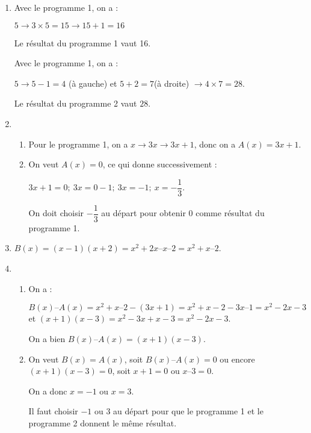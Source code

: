 
\medskip

\begin{enumerate}
\item Avec le programme 1, on a :

$5 \to  3 \times 5 = 15 \to 15 + 1 = 16$

Le résultat du programme 1 vaut 16.
 
Avec le programme 1, on a :

$5 \to 5 - 1 = 4$ (à gauche) et  $5 + 2 = 7 $(à droite) $\to  4 \times 7 = 28$.

Le résultat du programme 2 vaut $28$.
\item 
	\begin{enumerate}
		\item Pour le programme 1, on a $x \to  3x \to  3x + 1$, donc on a
$A(x) = 3x + 1$.
		\item  On veut $A(x) = 0$, ce qui donne successivement :
		
$3x + 1 = 0 ;\: 3x = 0 - 1 ; \:3x = -1  ;\: x = - \dfrac{1}{3}$.

On doit choisir $- \dfrac{1}{3}$ au départ pour obtenir $0$ comme résultat du programme 1.
	\end{enumerate} 
\item  $B(x) = (x - 1)(x + 2) = x^2 + 2x – x – 2 = x^2 + x – 2$.
\item 
	\begin{enumerate}
		\item On a : 
		
$B(x) – A(x) = x^2 + x – 2 - (3x + 1) = x^2 + x - 2 - 3x – 1 = x^2 - 2x - 3$
et $(x + 1)(x - 3) = x^2 - 3x + x - 3 = x^2 - 2x - 3$.

On a bien $B(x) – A(x) = (x + 1)(x - 3)$.
		\item  On veut $B(x) = A(x)$, soit $B(x) – A(x) = 0$ ou encore
$(x + 1)(x - 3) = 0$, soit $x + 1 = 0$ ou $x – 3 = 0$.

On a donc $x = - 1$ ou $x = 3$.

Il faut choisir $- 1$ ou $3$ au départ pour que le programme 1 et le programme 2 donnent le même résultat. 
	\end{enumerate}
\end{enumerate}
